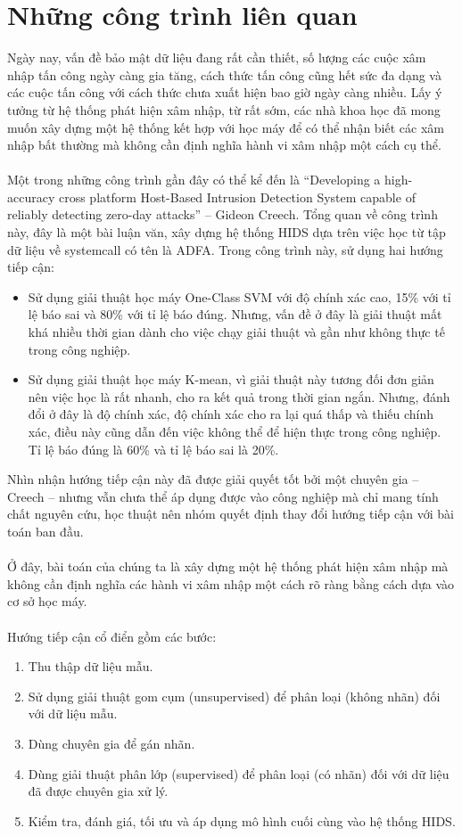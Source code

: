 \chapter{Những công trình liên quan}
Ngày nay, vấn đề bảo mật dữ liệu đang rất cần thiết, số lượng các cuộc xâm nhập
tấn công ngày càng gia tăng, cách thức tấn công cũng hết sức đa dạng và các cuộc
tấn công với cách thức chưa xuất hiện bao giờ ngày càng nhiều. Lấy ý tưởng từ hệ
thống phát hiện xâm nhập, từ rất sớm, các nhà khoa học đã mong muốn xây dựng một
hệ thống kết hợp với học máy để có thể nhận biết các xâm nhập bất thường mà
không cần định nghĩa hành vi xâm nhập một cách cụ thể.\\\\  
 Một trong những
công trình gần đây có thể kể đến là “Developing a high-accuracy cross platform
Host-Based Intrusion Detection System capable of reliably detecting zero-day
attacks” – Gideon Creech. Tổng quan về công trình này, đây là một bài luận văn,
xây dựng hệ thống HIDS dựa trên việc học từ tập dữ liệu về systemcall có tên là
ADFA. Trong công trình này, sử dụng hai hướng tiếp cận:
\begin{itemize}
  \item Sử dụng giải thuật học máy One-Class SVM với độ chính xác cao, 15\%
   với tỉ lệ báo sai và 80\% với tỉ lệ báo đúng. Nhưng, vấn đề ở đây là giải
   thuật mất khá nhiều thời gian dành cho việc chạy giải thuật và gần như
   không thực tế trong công nghiệp.
   \item Sử dụng giải thuật học máy K-mean, vì giải thuật này tương đối đơn
   giản nên việc học là rất nhanh, cho ra kết quả trong thời gian ngắn. Nhưng,
   đánh đổi ở đây là độ chính xác, độ chính xác cho ra lại quá thấp và thiếu
   chính xác, điều này cũng dẫn đến việc không thể để hiện thực trong công nghiệp. Tỉ lệ báo đúng là 60\% và tỉ lệ báo sai là 20\%.
\end{itemize}
Nhìn nhận hướng tiếp cận này đã được giải quyết tốt bởi một chuyên gia – Creech
– nhưng vẫn chưa thể áp dụng được vào công nghiệp mà chỉ mang tính chất nguyên
cứu, học thuật nên nhóm quyết định thay đổi hướng tiếp cận với bài toán ban
đầu.\\\\ 
Ở đây, bài toán của chúng ta là xây dựng một hệ thống phát hiện
xâm nhập mà không cần định nghĩa các hành vi xâm nhập một cách rõ ràng bằng cách
dựa vào cơ sở học máy.\\\\ 
Hướng tiếp cận cổ điển gồm các bước:
\begin{enumerate}
  \item Thu thập dữ liệu mẫu.
  \item Sử dụng giải thuật gom cụm (unsupervised) để phân loại (không nhãn)
  đối với dữ liệu mẫu.
  \item Dùng chuyên gia để gán nhãn.
  \item Dùng giải thuật phân lớp (supervised) để phân loại (có nhãn) đối với dữ
  liệu đã được chuyên gia xử lý.
  \item Kiểm tra, đánh giá, tối ưu và áp dụng mô hình cuối cùng vào hệ thống
  HIDS.
\end{enumerate}
